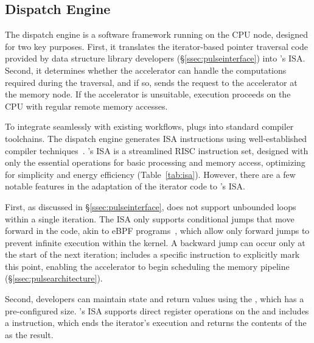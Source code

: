 \subsection{\pulse Dispatch Engine}
\label{ssec:compute_node}
The dispatch engine is a software framework running on the CPU node, designed for two key purposes. First, it translates the iterator-based pointer traversal code provided by data structure library developers (\S\ref{ssec:pulseinterface}) into \pulse's ISA. Second, it determines whether the accelerator can handle the computations required during the traversal, and if so, sends the request to the accelerator at the memory node. If the accelerator is unsuitable, execution proceeds on the CPU with regular remote memory accesses.

 To integrate seamlessly with existing workflows, \pulse plugs into standard compiler toolchains. The dispatch engine generates \pulse ISA instructions using well-established compiler techniques~\cite{llvm}. \pulse's ISA is a streamlined RISC instruction set, designed with only the essential operations for basic processing and memory access, optimizing for simplicity and energy efficiency (Table~\ref{tab:isa}). However, there are a few notable features in the adaptation of the iterator code to \pulse's ISA. 

First, as discussed in \S\ref{ssec:pulseinterface}, \pulse does not support unbounded loops within a single iteration. The ISA only supports conditional jumps that move forward in the code, akin to eBPF programs~\cite{ebpfjump}, which allow only forward jumps to prevent infinite execution within the kernel. A backward jump can occur only at the start of the next iteration; \pulse includes a specific  instruction to explicitly mark this point, enabling the accelerator to begin scheduling the memory pipeline (\S\ref{ssec:pulsearchitecture}). 

Second, developers can maintain state and return values using the , which has a pre-configured size. \pulse's ISA supports direct register operations on the  and includes a  instruction, which ends the iterator's execution and returns the contents of the  as the result.

